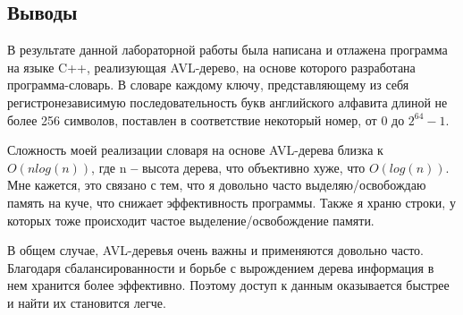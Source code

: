\documentclass[12pt]{article}
\begin{document}
\newpage
\subsection*{Выводы}


В результате данной лабораторной работы была написана и отлажена программа на языке C++, реализующая AVL-дерево, на основе которого разработана программа-словарь. В словаре каждому ключу, представляющему из себя регистронезависимую последовательность букв английского алфавита длиной не более 256 символов, поставлен в соответствие некоторый номер, от 0 до ${2^{64} - 1}$.

Сложность моей реализации словаря на основе AVL-дерева близка к ${O}(nlog(n))$, где n \textbf{--} высота дерева, что объективно хуже, что ${O}(log(n))$. Мне кажется, это связано с тем, что я довольно часто выделяю/освобождаю память на куче, что снижает эффективность программы. Также я храню строки, у которых тоже происходит частое выделение/освобождение памяти. 

В общем случае, AVL-деревья очень важны и применяются довольно часто. Благодаря сбалансированности и борьбе с вырождением дерева информация в нем хранится более эффективно. Поэтому доступ к данным оказывается быстрее и найти их становится легче.
\end{document}
